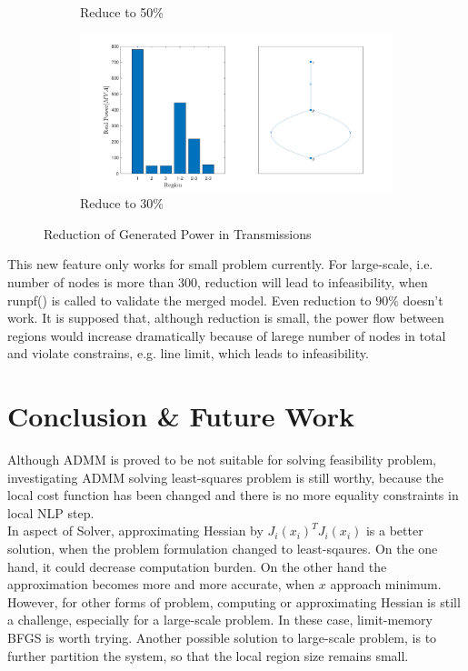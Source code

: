 \documentclass{article}
\begin{document}
\begin{figure}[hbt!]
\begin{subfigure}{.5\textwidth}
  \caption{Reduce to 50\%}
  \label{fig:sfig2}
\end{subfigure}
\begin{subfigure}{.5\textwidth}
  \centering
  \includegraphics[width=0.9\linewidth]{Simulation_Results/reduce_to_30.pdf}
  \caption{Reduce to 30\%}
  \label{fig:sfig2}
\end{subfigure}
\caption{Reduction of Generated Power in Transmissions}
\label{fig:reduction of power}
\end{figure}

This new feature only works for small problem currently. For large-scale, i.e. number of nodes is more than $300$, reduction  will lead to infeasibility, when runpf() is called to validate the merged model. Even reduction to $90\%$ doesn't work. It is supposed that, although  reduction is small, the power flow between regions would increase dramatically because of larege number of nodes in total and violate constrains, e.g. line limit, which leads to infeasibility. 
\newpage
\section{Conclusion \& Future Work}

Although ADMM is proved to be not suitable for solving feasibility problem, investigating ADMM solving least-squares problem is still worthy, because the local cost function has been changed and there is no more equality constraints in local NLP step. \\

In aspect of Solver, approximating Hessian by $J_i(x_i)^T J_i(x_i)$ is a better solution, when the problem formulation changed to least-sqaures. On the one hand, it could decrease computation burden. On the other hand the approximation becomes more and more accurate, when $x$ approach minimum. However, for other forms of problem, computing or approximating Hessian is still a challenge, especially for a large-scale problem. In these case, limit-memory BFGS is worth trying. Another possible solution to large-scale problem, is to further partition the system, so that the local region size remains small.\\
\end{document}
